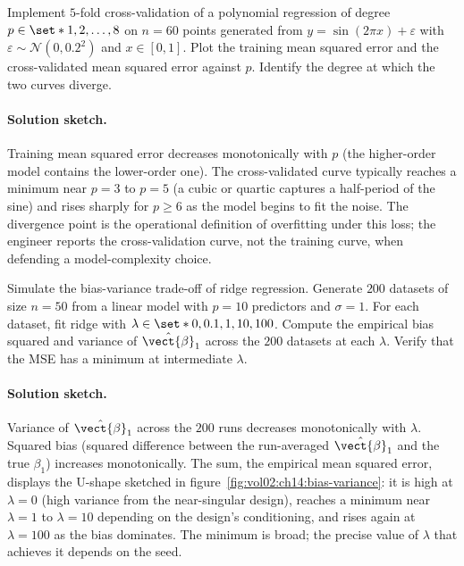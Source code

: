 \begin{exercise}
Implement $5$-fold cross-validation of a polynomial regression of
degree $p \in \set*{1, 2, \ldots, 8}$ on $n = 60$ points generated
from $y = \sin(2\pi x) + \varepsilon$ with $\varepsilon \sim
\mathcal{N}(0, 0.2^{2})$ and $x \in [0, 1]$. Plot the training
mean squared error and the cross-validated mean squared error
against $p$. Identify the degree at which the two curves diverge.

\paragraph{Solution sketch.} Training mean squared error
decreases monotonically with $p$ (the higher-order model contains
the lower-order one). The cross-validated curve typically
reaches a minimum near $p = 3$ to $p = 5$ (a cubic or quartic
captures a half-period of the sine) and rises sharply for $p
\geq 6$ as the model begins to fit the noise. The divergence
point is the operational definition of overfitting under this
loss; the engineer reports the cross-validation curve, not the
training curve, when defending a model-complexity choice.
\end{exercise}

\begin{exercise}
Simulate the bias-variance trade-off of ridge regression. Generate
$200$ datasets of size $n = 50$ from a linear model with $p = 10$
predictors and $\sigma = 1$. For each dataset, fit ridge with
$\lambda \in \set*{0, 0.1, 1, 10, 100}$. Compute the empirical
bias squared and variance of $\hat{\vect{\beta}}_{1}$ across the
$200$ datasets at each $\lambda$. Verify that the MSE has a
minimum at intermediate $\lambda$.

\paragraph{Solution sketch.} Variance of
$\hat{\vect{\beta}}_{1}$ across the $200$ runs decreases
monotonically with $\lambda$. Squared bias (squared difference
between the run-averaged $\hat{\vect{\beta}}_{1}$ and the true
$\beta_{1}$) increases monotonically. The sum, the empirical
mean squared error, displays the U-shape sketched in
figure~\ref{fig:vol02:ch14:bias-variance}: it is high at $\lambda
= 0$ (high variance from the near-singular design), reaches a
minimum near $\lambda = 1$ to $\lambda = 10$ depending on the
design's conditioning, and rises again at $\lambda = 100$ as
the bias dominates. The minimum is broad; the precise value of
$\lambda$ that achieves it depends on the seed.
\end{exercise}

